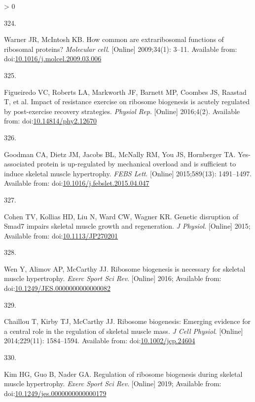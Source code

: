 \documentclass[twoside,10pt]{gihclass} %
\newlength{\cslhangindent}
\newlength{\csllabelwidth}
\newenvironment{CSLReferences}[3] %
 {%
  \setlength{\parindent}{0pt}
  \ifodd #1 \everypar{\setlength{\hangindent}{\cslhangindent}}\ignorespaces\fi
  \ifnum #2 > 0
  \setlength{\parskip}{#2\baselineskip}
  \fi
 }%
 {}
\newcommand{\CSLLeftMargin}[1]{\parbox[t]{\maxof{\widthof{#1}}{\csllabelwidth}}{#1}}
\newcommand{\CSLRightInline}[1]{\parbox[t]{\linewidth}{#1}}
\begin{document}
\begin{CSLReferences}{0}{0}
\leavevmode\hypertarget{ref-RN2588}{}%
\CSLLeftMargin{324. }
\CSLRightInline{Warner JR, McIntosh KB. How common are extraribosomal functions of ribosomal proteins? \emph{Molecular cell}. {[}Online{]} 2009;34(1): 3--11. Available from: doi:\href{https://doi.org/10.1016/j.molcel.2009.03.006}{10.1016/j.molcel.2009.03.006}}

\leavevmode\hypertarget{ref-RN1746}{}%
\CSLLeftMargin{325. }
\CSLRightInline{Figueiredo VC, Roberts LA, Markworth JF, Barnett MP, Coombes JS, Raastad T, et al. Impact of resistance exercise on ribosome biogenesis is acutely regulated by post-exercise recovery strategies. \emph{Physiol Rep}. {[}Online{]} 2016;4(2). Available from: doi:\href{https://doi.org/10.14814/phy2.12670}{10.14814/phy2.12670}}

\leavevmode\hypertarget{ref-RN1931}{}%
\CSLLeftMargin{326. }
\CSLRightInline{Goodman CA, Dietz JM, Jacobs BL, McNally RM, You JS, Hornberger TA. Yes-associated protein is up-regulated by mechanical overload and is sufficient to induce skeletal muscle hypertrophy. \emph{FEBS Lett}. {[}Online{]} 2015;589(13): 1491--1497. Available from: doi:\href{https://doi.org/10.1016/j.febslet.2015.04.047}{10.1016/j.febslet.2015.04.047}}

\leavevmode\hypertarget{ref-RN1619}{}%
\CSLLeftMargin{327. }
\CSLRightInline{Cohen TV, Kollias HD, Liu N, Ward CW, Wagner KR. Genetic disruption of Smad7 impairs skeletal muscle growth and regeneration. \emph{J Physiol}. {[}Online{]} 2015; Available from: doi:\href{https://doi.org/10.1113/JP270201}{10.1113/JP270201}}

\leavevmode\hypertarget{ref-RN1757}{}%
\CSLLeftMargin{328. }
\CSLRightInline{Wen Y, Alimov AP, McCarthy JJ. Ribosome biogenesis is necessary for skeletal muscle hypertrophy. \emph{Exerc Sport Sci Rev}. {[}Online{]} 2016; Available from: doi:\href{https://doi.org/10.1249/JES.0000000000000082}{10.1249/JES.0000000000000082}}

\leavevmode\hypertarget{ref-RN1654}{}%
\CSLLeftMargin{329. }
\CSLRightInline{Chaillou T, Kirby TJ, McCarthy JJ. Ribosome biogenesis: Emerging evidence for a central role in the regulation of skeletal muscle mass. \emph{J Cell Physiol}. {[}Online{]} 2014;229(11): 1584--1594. Available from: doi:\href{https://doi.org/10.1002/jcp.24604}{10.1002/jcp.24604}}

\leavevmode\hypertarget{ref-RN2150}{}%
\CSLLeftMargin{330. }
\CSLRightInline{Kim HG, Guo B, Nader GA. Regulation of ribosome biogenesis during skeletal muscle hypertrophy. \emph{Exerc Sport Sci Rev}. {[}Online{]} 2019; Available from: doi:\href{https://doi.org/10.1249/jes.0000000000000179}{10.1249/jes.0000000000000179}}


\end{CSLReferences}
\end{document}
